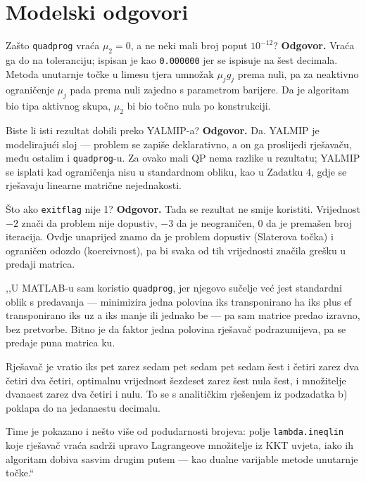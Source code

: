 \section{Modelski odgovori}
\label{sec:z1d-odgovori}

\begin{pitanje}{Zašto \texttt{quadprog} vraća $\mu_2 = 0$, a ne neki mali broj poput $10^{-12}$?}
\textbf{Odgovor.} Vraća ga do na toleranciju; ispisan je kao \texttt{0.000000}
jer se ispisuje na šest decimala. Metoda unutarnje točke u limesu tjera umnožak
$\mu_j g_j$ prema nuli, pa za neaktivno ograničenje $\mu_j$ pada prema nuli
zajedno s parametrom barijere. Da je algoritam bio tipa aktivnog skupa,
$\mu_2$ bi bio točno nula po konstrukciji.
\end{pitanje}

\begin{pitanje}{Biste li isti rezultat dobili preko YALMIP-a?}
\textbf{Odgovor.} Da. YALMIP je modelirajući sloj --- problem se zapiše
deklarativno, a on ga proslijedi rješavaču, među ostalim i \texttt{quadprog}-u.
Za ovako mali QP nema razlike u rezultatu; YALMIP se isplati kad ograničenja nisu
u standardnom obliku, kao u Zadatku 4, gdje se rješavaju linearne matrične
nejednakosti.
\end{pitanje}

\begin{pitanje}{Što ako \texttt{exitflag} nije 1?}
\textbf{Odgovor.} Tada se rezultat ne smije koristiti. Vrijednost $-2$ znači da
problem nije dopustiv, $-3$ da je neograničen, $0$ da je premašen broj
iteracija. Ovdje unaprijed znamo da je problem dopustiv (Slaterova točka) i
ograničen odozdo (koercivnost), pa bi svaka od tih vrijednosti značila grešku u
predaji matrica.
\end{pitanje}

\begin{izgovor}
,,U MATLAB-u sam koristio \texttt{quadprog}, jer njegovo sučelje već jest
standardni oblik s predavanja --- minimizira jedna polovina iks transponirano ha
iks plus ef transponirano iks uz a iks manje ili jednako be --- pa sam matrice
predao izravno, bez pretvorbe. Bitno je da faktor jedna polovina rješavač
podrazumijeva, pa se predaje puna matrica ku.

Rješavač je vratio iks pet zarez sedam pet sedam pet sedam šest i četiri zarez
dva četiri dva četiri, optimalnu vrijednost šezdeset zarez šest nula šest, i
množitelje dvanaest zarez dva četiri i nulu. To se s analitičkim rješenjem iz
podzadatka b) poklapa do na jedanaestu decimalu.

Time je pokazano i nešto više od podudarnosti brojeva: polje
\texttt{lambda.ineqlin} koje rješavač vraća sadrži upravo Lagrangeove
množitelje iz KKT uvjeta, iako ih algoritam dobiva sasvim drugim putem --- kao
dualne varijable metode unutarnje točke.``
\end{izgovor}
